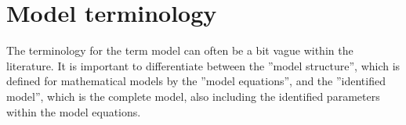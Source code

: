 \section{Model terminology} \label{sec:terminology}
The terminology for the term model can often be a bit vague within the literature.
It is important to differentiate between the ''model structure'', which is defined for mathematical models by the ''model equations'', and the ''identified model'', which is the complete model, also including the identified parameters within the model equations. 